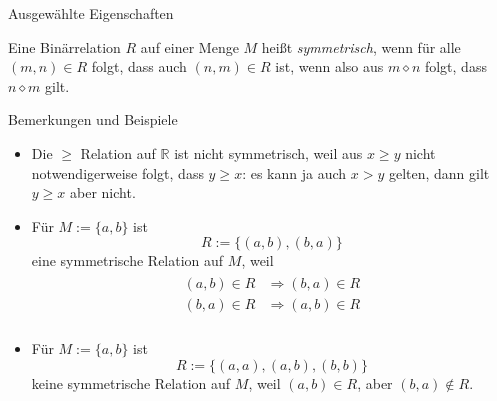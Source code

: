 \documentclass[
  8pt,
  ignorenonframetext,
]{beamer}
\providecommand{\tightlist}{%
  \setlength{\itemsep}{0pt}\setlength{\parskip}{0pt}}
\begin{document}
\begin{frame}{Ausgewählte Eigenschaften}
\protect\hypertarget{ausgewuxe4hlte-eigenschaften-1}{}
\small
\begin{definition}[Symmetrie]
\justifying
Eine Binärrelation $R$ auf einer Menge $M$ heißt \textit{symmetrisch}, wenn für alle
$(m,n)\in R$ folgt, dass auch $(n,m)\in R$ ist, wenn also aus $m \diamond n$ folgt,
dass $n \diamond m$ gilt.
\end{definition}

\footnotesize

Bemerkungen und Beispiele

\begin{itemize}
\tightlist
\item
  Die \(\ge\) Relation auf \(\mathbb{R}\) ist nicht symmetrisch, weil
  aus \(x \ge y\) nicht notwendigerweise folgt, dass \(y \ge x\): es
  kann ja auch \(x>y\) gelten, dann gilt \(y \ge x\) aber nicht.
\item
  Für \(M := \{a,b\}\) ist \begin{equation}
  R := \{(a,b), (b,a)\}
  \end{equation} eine symmetrische Relation auf \(M\), weil
  \begin{align}
  \begin{split}
  (a,b) \in R & \Rightarrow (b,a) \in R \\
  (b,a) \in R & \Rightarrow (a,b) \in R \\
  \end{split}
  \end{align}
\item
  Für \(M := \{a,b\}\) ist \begin{equation}
  R := \{(a,a), (a,b), (b,b)\}
  \end{equation} keine symmetrische Relation auf \(M\), weil
  \((a,b) \in R\), aber \((b,a) \notin R\).
\end{itemize}
\end{frame}
\end{document}
